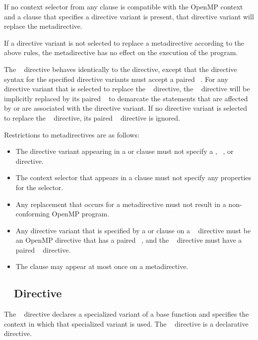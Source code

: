 If no context selector from any  clause is compatible with the
OpenMP context and a  clause that specifies a directive
variant is present, that directive variant will replace the metadirective.

If a directive variant is not selected to replace a metadirective according
to the above rules, the metadirective has no effect on the execution of the
program.

The ~ directive behaves identically to the
 directive, except that the directive syntax for the
specified directive variants must accept a paired ~.
For any directive variant that is selected to replace the
~ directive, the
~ directive will be implicitly replaced by its
paired ~ to demarcate the statements that are
affected by or are associated with the directive variant. If no directive
variant is selected to replace the ~
directive, its paired ~ directive is ignored.

\restrictions
Restrictions to metadirectives are as follows:

\begin{itemize}
\item The directive variant appearing in a  or 
      clause must not specify a ,
      ~, or ~
      directive.
\item The context selector that appears in a  clause must not
      specify any properties for the  selector.
\item Any replacement that occurs for a metadirective must not result in a
      non-conforming OpenMP program.
\item Any directive variant that is specified by a  or 
      clause on a ~
      directive must be an OpenMP directive that has a paired 
      ~, and the ~ 
      directive must have a paired ~ directive.
\item The  clause may appear at most once on a metadirective.
\end{itemize}



\subsection{~ Directive}
\label{subsec:declare variant Directive}
\summary
The ~ directive declares a specialized variant
of a base function and specifies the context in which that specialized variant
is used. The ~ directive is a declarative
directive.

